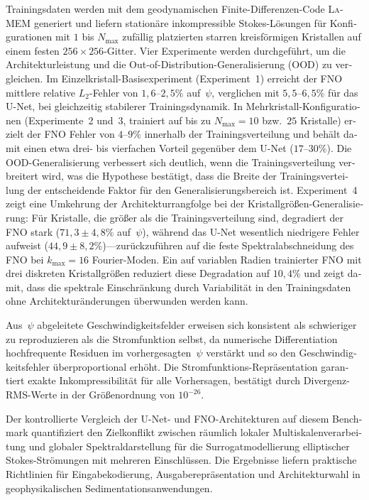 \begin{otherlanguage}{ngerman}
Trainingsdaten werden mit dem geodynamischen Finite-Differenzen-Code
\textsc{LaMEM} generiert und liefern stationäre inkompressible Stokes-Lösungen
für Konfigurationen mit $1$ bis $N_{\max}$ zufällig platzierten starren
kreisförmigen Kristallen auf einem festen $256 \times 256$-Gitter. Vier
Experimente werden durchgeführt, um die Architekturleistung und die
Out-of-Distribution-Generalisierung (OOD) zu vergleichen. Im Einzelkristall-Basisexperiment
(Experiment~1) erreicht der FNO mittlere relative $L_2$-Fehler von
$1{,}6$--$2{,}5\%$ auf~$\psi$, verglichen mit $5{,}5$--$6{,}5\%$ für das
U-Net, bei gleichzeitig stabilerer Trainingsdynamik. In
Mehrkristall-Konfigurationen (Experimente~2 und~3, trainiert auf bis zu
$N_{\max} = 10$ bzw.\ $25$ Kristalle) erzielt der FNO Fehler von $4$--$9\%$
innerhalb der Trainingsverteilung und behält damit einen etwa drei- bis vierfachen
Vorteil gegenüber dem U-Net ($17$--$30\%$). Die OOD-Generalisierung verbessert
sich deutlich, wenn die Trainingsverteilung verbreitert wird, was die Hypothese
bestätigt, dass die Breite der Trainingsverteilung der entscheidende Faktor für
den Generalisierungsbereich ist. Experiment~4 zeigt eine Umkehrung der
Architekturrangfolge bei der Kristallgrößen-Generalisierung: Für Kristalle, die
größer als die Trainingsverteilung sind, degradiert der FNO stark
($71{,}3 \pm 4{,}8\%$ auf~$\psi$), während das U-Net wesentlich niedrigere
Fehler aufweist ($44{,}9 \pm 8{,}2\%$)—zurückzuführen auf die feste
Spektralabschneidung des FNO bei $k_{\max} = 16$ Fourier-Moden. Ein auf variablen Radien
trainierter FNO mit drei diskreten Kristallgrößen reduziert diese Degradation
auf $10{,}4\%$ und zeigt damit, dass die spektrale Einschränkung durch
Variabilität in den Trainingsdaten ohne Architekturänderungen überwunden
werden kann.

Aus~$\psi$ abgeleitete Geschwindigkeitsfelder erweisen sich
konsistent als schwieriger zu reproduzieren als die Stromfunktion selbst, da
numerische Differentiation hochfrequente Residuen im vorhergesagten~$\psi$
verstärkt und so den Geschwindigkeitsfehler überproportional erhöht. Die
Stromfunktions-Repräsentation garantiert exakte Inkompressibilität für alle
Vorhersagen, bestätigt durch Divergenz-RMS-Werte in der Größenordnung von
$10^{-26}$.

Der kontrollierte Vergleich der U-Net- und FNO-Architekturen auf diesem Benchmark
quantifiziert den Zielkonflikt zwischen räumlich lokaler Multiskalenverarbeitung
und globaler Spektraldarstellung für die Surrogatmodellierung elliptischer
Stokes-Strömungen mit mehreren Einschlüssen. Die Ergebnisse liefern praktische
Richtlinien für Eingabekodierung, Ausgaberepräsentation und Architekturwahl in
geophysikalischen Sedimentationsanwendungen.
\end{otherlanguage}
